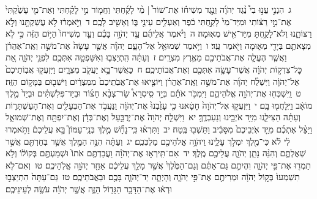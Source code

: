 \documentclass[18pt]{article}
\newcommand{\kri}[1]{\Afootnote{#1}}	%
\begin{document}
 {\loc ג~}הִנְנִ֣י עֲנ֣וּ בִי֩ נֶ֨גֶד יְהֹוָ֜ה וְנֶ֣גֶד מְשִׁיח֗וֹ אֶת־שׁוֹר֩  |  מִ֨י לָקַ֜חְתִּי וַחֲמ֧וֹר מִ֣י לָקַ֗חְתִּי וְאֶת־מִ֤י עָשַׁ֙קְתִּי֙ אֶת־מִ֣י רַצּ֔וֹתִי וּמִיַּד־מִי֙ לָקַ֣חְתִּי כֹ֔פֶר וְאַעְלִ֥ים עֵינַ֖י בּ֑וֹ וְאָשִׁ֖יב לָכֶֽם׃ \startlock
 {\loc ד~}וַיֹּ֣אמְר֔וּ לֹ֥א עֲשַׁקְתָּ֖נוּ וְלֹ֣א רַצּוֹתָ֑נוּ וְלֹא־לָקַ֥חְתָּ מִיַּד־אִ֖ישׁ מְאֽוּמָה׃ \startlock
 {\loc ה~}וַיֹּ֨אמֶר אֲלֵיהֶ֜ם עֵ֧ד יְהֹוָ֣ה בָּכֶ֗ם וְעֵ֤ד מְשִׁיחוֹ֙ הַיּ֣וֹם הַזֶּ֔ה כִּ֣י לֹ֧א מְצָאתֶ֛ם בְּיָדִ֖י מְא֑וּמָה וַיֹּ֖אמֶר עֵֽד׃ \startlock
 {\loc ו~}וַיֹּ֥אמֶר שְׁמוּאֵ֖ל אֶל־הָעָ֑ם יְהֹוָ֗ה אֲשֶׁ֤ר עָשָׂה֙ אֶת־מֹשֶׁ֣ה וְאֶֽת־אַהֲרֹ֔ן וַאֲשֶׁ֧ר הֶעֱלָ֛ה אֶת־אֲבֹתֵיכֶ֖ם מֵאֶ֥רֶץ מִצְרָֽיִם׃ \startlock
 {\loc ז~}וְעַתָּ֗ה הִֽתְיַצְּב֛וּ וְאִשָּׁפְטָ֥ה אִתְּכֶ֖ם לִפְנֵ֣י יְהֹוָ֑ה אֵ֚ת כׇּל־צִדְק֣וֹת יְהֹוָ֔ה אֲשֶׁר־עָשָׂ֥ה אִתְּכֶ֖ם וְאֶת־אֲבוֹתֵיכֶֽם׃ \startlock
 {\loc ח~}כַּאֲשֶׁר־בָּ֥א יַעֲקֹ֖ב מִצְרָ֑יִם וַיִּזְעֲק֤וּ אֲבֽוֹתֵיכֶם֙ אֶל־יְהֹוָ֔ה וַיִּשְׁלַ֨ח יְהֹוָ֜ה אֶת־מֹשֶׁ֣ה וְאֶֽת־אַהֲרֹ֗ן וַיּוֹצִ֤יאוּ אֶת־אֲבֹֽתֵיכֶם֙ מִמִּצְרַ֔יִם וַיֹּשִׁב֖וּם בַּמָּק֥וֹם הַזֶּֽה׃ \startlock
 {\loc ט~}וַֽיִּשְׁכְּח֖וּ אֶת־יְהֹוָ֣ה אֱלֹהֵיהֶ֑ם וַיִּמְכֹּ֣ר אֹתָ֡ם בְּיַ֣ד סִֽיסְרָא֩ שַׂר־צְבָ֨א חָצ֜וֹר וּבְיַד־פְּלִשְׁתִּ֗ים וּבְיַד֙ מֶ֣לֶךְ מוֹאָ֔ב וַיִּֽלָּחֲמ֖וּ בָּֽם׃ \startlock
 {\loc י~}וַיִּזְעֲק֤וּ אֶל־יְהֹוָה֙  \edtext{(ויאמר)}{\kri{קרי: וַיֹּֽאמְר֣וּ}}  חָטָ֔אנוּ כִּ֤י עָזַ֙בְנוּ֙ אֶת־יְהֹוָ֔ה וַנַּעֲבֹ֥ד אֶת־הַבְּעָלִ֖ים וְאֶת־הָעַשְׁתָּר֑וֹת וְעַתָּ֗ה הַצִּילֵ֛נוּ מִיַּ֥ד אֹיְבֵ֖ינוּ וְנַעַבְדֶֽךָּ׃ \startlock
 {\loc יא~}וַיִּשְׁלַ֤ח יְהֹוָה֙ אֶת־יְרֻבַּ֣עַל וְאֶת־בְּדָ֔ן וְאֶת־יִפְתָּ֖ח וְאֶת־שְׁמוּאֵ֑ל וַיַּצֵּ֨ל אֶתְכֶ֜ם מִיַּ֤ד אֹֽיְבֵיכֶם֙ מִסָּבִ֔יב וַתֵּשְׁב֖וּ בֶּֽטַח׃ \startlock
 {\loc יב~}וַתִּרְא֗וּ כִּֽי־נָחָ֞שׁ מֶ֣לֶךְ בְּנֵֽי־עַמּוֹן֮ בָּ֣א עֲלֵיכֶם֒ וַתֹּ֣אמְרוּ לִ֔י לֹ֕א כִּי־מֶ֖לֶךְ יִמְלֹ֣ךְ עָלֵ֑ינוּ וַיהֹוָ֥ה אֱלֹהֵיכֶ֖ם מַלְכְּכֶֽם׃ \startlock
 {\loc יג~}וְעַתָּ֗ה הִנֵּ֥ה הַמֶּ֛לֶךְ אֲשֶׁ֥ר בְּחַרְתֶּ֖ם אֲשֶׁ֣ר שְׁאֶלְתֶּ֑ם וְהִנֵּ֨ה נָתַ֧ן יְהֹוָ֛ה עֲלֵיכֶ֖ם מֶֽלֶךְ׃ \startlock
 {\loc יד~}אִם־תִּֽירְא֣וּ אֶת־יְהֹוָ֗ה וַעֲבַדְתֶּ֤ם אֹתוֹ֙ וּשְׁמַעְתֶּ֣ם בְּקוֹל֔וֹ וְלֹ֥א תַמְר֖וּ אֶת־פִּ֣י יְהֹוָ֑ה וִהְיִתֶ֣ם גַּם־אַתֶּ֗ם וְגַם־הַמֶּ֙לֶךְ֙ אֲשֶׁ֣ר מָלַ֣ךְ עֲלֵיכֶ֔ם אַחַ֖ר יְהֹוָ֥ה אֱלֹֽהֵיכֶֽם׃ \startlock
 {\loc טו~}וְאִם־לֹ֤א תִשְׁמְעוּ֙ בְּק֣וֹל יְהֹוָ֔ה וּמְרִיתֶ֖ם אֶת־פִּ֣י יְהֹוָ֑ה וְהָיְתָ֧ה יַד־יְהֹוָ֛ה בָּכֶ֖ם וּבַאֲבֹתֵיכֶֽם׃ \startlock
 {\loc טז~}גַּם־עַתָּה֙ הִתְיַצְּב֣וּ וּרְא֔וּ אֶת־הַדָּבָ֥ר הַגָּד֖וֹל הַזֶּ֑ה אֲשֶׁ֣ר יְהֹוָ֔ה עֹשֶׂ֖ה לְעֵינֵיכֶֽם׃ \startlock
\end{document}
